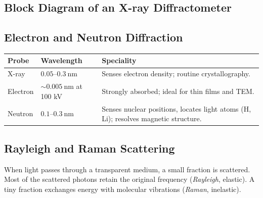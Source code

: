 \documentclass[12pt,a4paper]{article}
\begin{document}
\subsection{Block Diagram of an X-ray Diffractometer}
\begin{tcolorbox}[tikzbox, title={Block Diagram of a Powder Diffractometer}]
\centering
{}
\end{tcolorbox}

\subsection{Electron and Neutron Diffraction}
\begin{tabularx}{\linewidth}{|B{2.4cm}|Y|Y|}
\hline
\textbf{Probe} & \textbf{Wavelength} & \textbf{Speciality} \\
\hline
X-ray & $0.05$--$0.3\ \mathrm{nm}$ & Senses electron density; routine crystallography. \\
\hline
Electron & $\sim 0.005\ \mathrm{nm}$ at 100 kV & Strongly absorbed; ideal for thin films and TEM. \\
\hline
Neutron & $0.1$--$0.3\ \mathrm{nm}$ & Senses nuclear positions, locates light atoms (H, Li); resolves magnetic structure. \\
\hline
\end{tabularx}

\subsection{Rayleigh and Raman Scattering}
When light passes through a transparent medium, a small fraction is scattered. Most of the scattered photons retain the original frequency (\emph{Rayleigh}, elastic). A tiny fraction exchanges energy with molecular vibrations (\emph{Raman}, inelastic).
\end{document}
